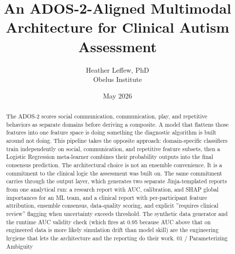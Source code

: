 \documentclass{obelus-preprint}
\title{An ADOS-2-Aligned Multimodal Architecture for Clinical Autism Assessment}
\author{Heather Leffew, PhD\\Obelus Institute}
\date{May 2026}
\begin{document}
\maketitle

\begin{abstract}
The ADOS-2 scores social communication, communication, play, and repetitive behaviors as separate domains before deriving a composite. A model that flattens those features into one feature space is doing something the diagnostic algorithm is built around not doing. This pipeline takes the opposite approach: domain-specific classifiers train independently on social, communication, and repetitive feature subsets, then a Logistic Regression meta-learner combines their probability outputs into the final consensus prediction. The architectural choice is not an ensemble convenience. It is a commitment to the clinical logic the assessment was built on. The same commitment carries through the output layer, which generates two separate Jinja-templated reports from one analytical run: a research report with AUC, calibration, and SHAP global importances for an ML team, and a clinical report with per-participant feature attribution, ensemble consensus, data-quality scoring, and explicit ''requires clinical review'' flagging when uncertainty exceeds threshold. The synthetic data generator and the runtime AUC validity check (which fires at 0.95 because AUC above that on engineered data is more likely simulation drift than model skill) are the engineering hygiene that lets the architecture and the reporting do their work.
01 / Parameterizing Ambiguity
\end{abstract}
\end{document}
